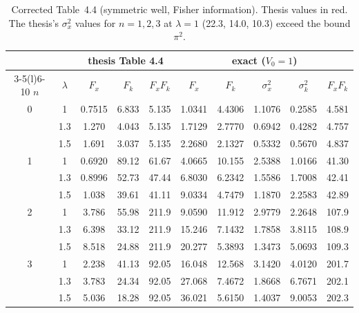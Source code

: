\documentclass[11pt,a4paper]{article}
\newcommand{\Th}[1]{\textcolor{BrickRed}{#1}}
\begin{document}
\begin{table}[h]
\centering\small
\setlength{\tabcolsep}{4.5pt}
\begin{tabular}{@{}cc ccc ccccc@{}}
\toprule
& & \multicolumn{3}{c}{thesis Table 4.4} & \multicolumn{5}{c}{exact ($V_0=1$)}\\
\cmidrule(lr){3-5}\cmidrule(l){6-10}
$n$ & $\lambda$ & $F_x$ & $F_k$ & $F_xF_k$ & $F_x$ & $F_k$ & $\sigma_x^2$ & $\sigma_k^2$ & $F_xF_k$\\
\midrule
0 & 1   & \Th{0.7515} & \Th{6.833} & \Th{5.135} & 1.0341 & 4.4306 & 1.1076 & 0.2585 & 4.581\\
  & 1.3 & \Th{1.270}  & \Th{4.043} & \Th{5.135} & 1.7129 & 2.7770 & 0.6942 & 0.4282 & 4.757\\
  & 1.5 & \Th{1.691}  & \Th{3.037} & \Th{5.135} & 2.2680 & 2.1327 & 0.5332 & 0.5670 & 4.837\\
1 & 1   & \Th{0.6920} & \Th{89.12} & \Th{61.67} & 4.0665 & 10.155 & 2.5388 & 1.0166 & 41.30\\
  & 1.3 & \Th{0.8996} & \Th{52.73} & \Th{47.44} & 6.8030 & 6.2342 & 1.5586 & 1.7008 & 42.41\\
  & 1.5 & \Th{1.038}  & \Th{39.61} & \Th{41.11} & 9.0334 & 4.7479 & 1.1870 & 2.2583 & 42.89\\
2 & 1   & \Th{3.786}  & \Th{55.98} & \Th{211.9} & 9.0590 & 11.912 & 2.9779 & 2.2648 & 107.9\\
  & 1.3 & \Th{6.398}  & \Th{33.12} & \Th{211.9} & 15.246 & 7.1432 & 1.7858 & 3.8115 & 108.9\\
  & 1.5 & \Th{8.518}  & \Th{24.88} & \Th{211.9} & 20.277 & 5.3893 & 1.3473 & 5.0693 & 109.3\\
3 & 1   & \Th{2.238}  & \Th{41.13} & \Th{92.05} & 16.048 & 12.568 & 3.1420 & 4.0120 & 201.7\\
  & 1.3 & \Th{3.783}  & \Th{24.34} & \Th{92.05} & 27.068 & 7.4672 & 1.8668 & 6.7671 & 202.1\\
  & 1.5 & \Th{5.036}  & \Th{18.28} & \Th{92.05} & 36.021 & 5.6150 & 1.4037 & 9.0053 & 202.3\\
\bottomrule
\end{tabular}
\caption{Corrected Table~4.4 (symmetric well, Fisher information). Thesis values in red. The
thesis's $\sigma_x^2$ values for $n=1,2,3$ at $\lambda=1$ (22.3, 14.0, 10.3) exceed the bound $\pi^2$.}
\label{tab:w44}
\end{table}

\clearpage
\end{document}
